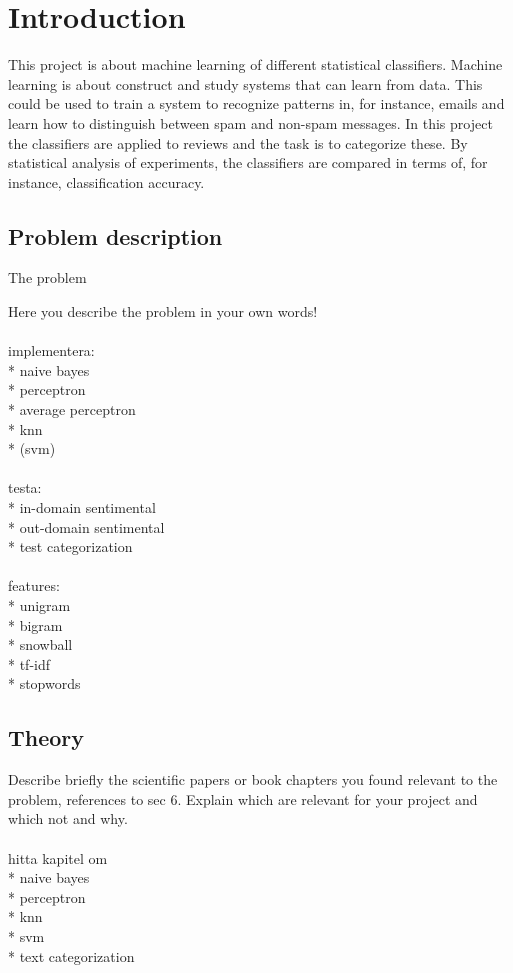\chapter{Introduction}
This project is about machine learning of different statistical classifiers. 
Machine learning is about construct and study systems that can learn from data. 
This could be used to train a system to recognize patterns in, for instance, emails and learn how to distinguish between spam and non-spam messages. In this project the classifiers are applied to reviews and the task is to categorize these. 
By statistical analysis of experiments, the classifiers are compared in terms of, for instance, classification accuracy.

\section{Problem description}
The problem 

Here you describe the problem in your own words!
\\\\
implementera:\\
* naive bayes\\
* perceptron\\
* average perceptron\\
* knn\\
* (svm)
\\\\
testa:\\
* in-domain sentimental\\
* out-domain sentimental\\
* test categorization
\\\\
features:\\
* unigram\\
* bigram\\
* snowball\\
* tf-idf\\
* stopwords

\section{Theory}
Describe briefly the scientific papers or book chapters you found relevant to the problem, references to sec 6. Explain which are relevant for your project and which not and why.
\\\\
hitta kapitel om\\
* naive bayes\\
* perceptron\\
* knn\\
* svm \\
* text categorization


